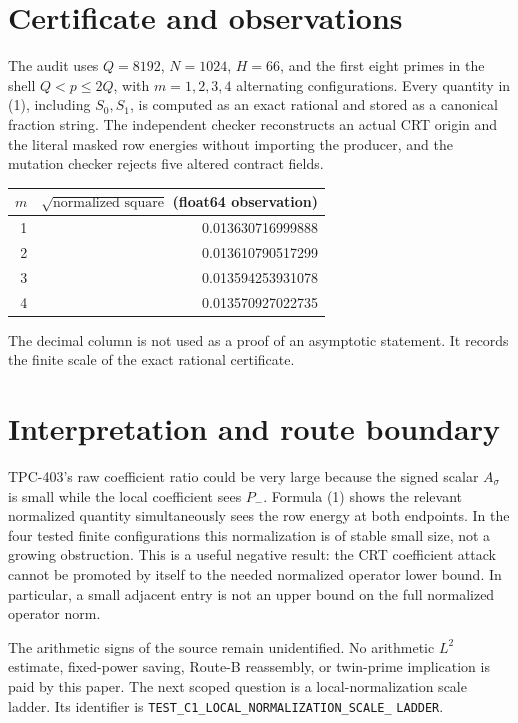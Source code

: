 \documentclass[11pt]{article}
\begin{document}
\section{Certificate and observations}
The audit uses $Q=8192$, $N=1024$, $H=66$, and the first eight primes in the
shell $Q<p\leq2Q$, with $m=1,2,3,4$ alternating configurations.  Every
quantity in (1), including $S_0,S_1$, is computed as an exact rational and
stored as a canonical fraction string.  The independent checker reconstructs
an actual CRT origin and the literal masked row energies without importing the
producer, and the mutation checker rejects
five altered contract fields.

\begin{center}
\begin{tabular}{@{}rr@{}}
\toprule
$m$ & $\sqrt{\text{normalized square}}$ (float64 observation)\\
\midrule
1 & 0.013630716999888\\
2 & 0.013610790517299\\
3 & 0.013594253931078\\
4 & 0.013570927022735\\
\bottomrule
\end{tabular}
\end{center}

The decimal column is not used as a proof of an asymptotic statement.  It
records the finite scale of the exact rational certificate.

\section{Interpretation and route boundary}
TPC-403's raw coefficient ratio could be very large because the signed scalar
$A_\sigma$ is small while the local coefficient sees $P_-$.  Formula (1)
shows the relevant normalized quantity simultaneously sees the row energy at
both endpoints.  In the four tested finite configurations this normalization
is of stable small size, not a growing obstruction.  This is a useful negative
result: the CRT coefficient attack cannot be promoted by itself to the needed
normalized operator lower bound.  In particular, a small adjacent entry is
not an upper bound on the full normalized operator norm.

The arithmetic signs of the source remain unidentified.  No arithmetic $L^2$
estimate, fixed-power saving, Route-B reassembly, or twin-prime implication is
paid by this paper.  The next scoped question is a local-normalization scale
ladder.  Its identifier is
\texttt{TEST\_C1\_LOCAL\_NORMALIZATION\_SCALE\_}\linebreak
\texttt{LADDER}.
\end{document}
